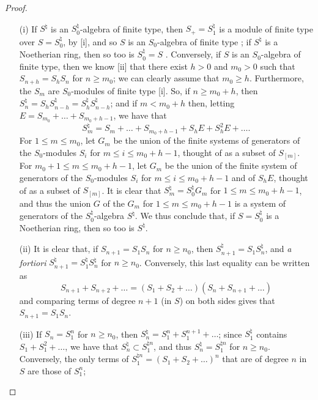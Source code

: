 \begin{proof}
\label{proof-2.8.2.10}
\begin{enumerate}
  \item[\rm{(i)}] If $S^\natural$ is an $S_0^\natural$-algebra of finite type, then $S_+=S_1^\natural$ is a module of finite type over $S=S_0^\natural$, by [i], and so $S$ is an $S_0$-algebra of finite type ;
    if $S^\natural$ is a Noetherian ring, then so too is $S_0^\natural=S$ .
    Conversely, if $S$ is an $S_0$-algebra
    of finite type, then we know [ii] that there exist $h>0$ and $m_0>0$ such that $S_{n+h}=S_hS_n$ for $n\geq m_0$;
    we can clearly assume that $m_0\geq h$.
    Furthermore, the $S_m$ are $S_0$-modules of finite type [i].
    So, if $n\geq m_0+h$, then $S_n^\natural = S_hS_{n-h}^\natural = S_h^\natural S_{n-h}^\natural$;
    and if $m<m_0+h$ then, letting $E = S_{m_0}+\ldots+S_{m_0+h-1}$, we have that
    \[
      S_m^\natural = S_m + \ldots + S_{m_0+h-1} + S_hE + S_h^2E + \ldots.
    \]
    For $1\leq m\leq m_0$, let $G_m$ be the union of the finite systems of generators of the $S_0$-modules $S_i$ for $m\leq i\leq m_0+h-1$, thought of as a subset of $S_{[m]}$.
    For $m_0+1\leq m\leq m_0+h-1$, let $G_m$ be the union of the finite system of generators of the $S_0$-modules $S_i$ for $m\leq i\leq m_0+h-1$ and of $S_hE$, thought of as a subset of $S_{[m]}$.
    It is clear that $S_m^\natural=S_0^\natural G_m$ for $1\leq m\leq m_0+h-1$, and thus the union $G$ of the $G_m$ for $1\leq m\leq m_0+h-1$ is a system of generators of the $S_0^\natural$-algebra $S^\natural$.
    We thus conclude that, if $S=S_0^\natural$ is a Noetherian ring, then so too is $S^\natural$.
  \item[\rm{(ii)}] It is clear that, if $S_{n+1}=S_1S_n$ for $n\geq n_0$, then $S_{n+1}^\natural=S_1S_n^\natural$, and \emph{a fortiori} $S_{n+1}^\natural=S_1^\natural S_n^\natural$ for $n\geq n_0$.
    Conversely, this last equality can be written as
    \[
      S_{n+1} + S_{n+2} + \ldots
      =
      (S_1 + S_2 + \ldots)(S_n + S_{n+1} + \ldots)
    \]
    and comparing terms of degree $n+1$ (in $S$) on both sides gives that $S_{n+1}=S_1S_n$.
  \item[\rm{(iii)}] If $S_n=S_1^n$ for $n\geq n_0$, then $S_n^\natural=S_1^n+S_1^{n+1}+\ldots$;
    since $S_1^\natural$ contains $S_1+S_1^2+\ldots$, we have that $S_n^\natural\subset S_1^{\natural n}$, and thus $S_n^\natural=S_1^{\natural n}$ for $n\geq n_0$.
    Conversely, the only terms of $S_1^{\natural n}=(S_1+S_2+\ldots)^n$ that are of degree $n$ in $S$ are those of $S_1^n$;

\end{enumerate}
\end{proof}
